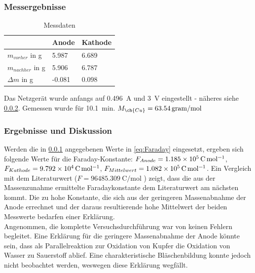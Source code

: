 \documentclass{article}
\begin{document}
      \subsubsection{Messergebnisse} \label{sec:MessergebnisseFaraday}
      
        \begin{table}[H]
          \centering
          \caption[Messdaten der Bestimmung der Faraday Konstante, Quelle: Autor]{Messdaten}
          \label{tab:MessdatenFaraday}
            \begin{tabular}{@{}l|ll@{}}
              \toprule
                & Anode & Kathode \\ \midrule
               $m_{vorher}$ in g & 5.987 & 6.689 \\
               $m_{nachher}$ in g & 5.906 & 6.787 \\
               $\Delta m$ in g & -0.081 & 0.098 \\ \bottomrule
            \end{tabular}
        \end{table}
        
        Das Netzgerät wurde anfangs auf \SI[mode=text]{0.496}{\ampere} und \SI[mode=text]{3}{\volt} eingestellt - näheres siehe \ref{sec:ErgebnisseFaraday}. Gemessen wurde für \SI[mode=text]{10.1}{\minute}. $M_{\ch{Cu}}=\SI[mode=text]{63.54}{gram\per\mole}$
        
      \subsubsection{Ergebnisse und Diskussion} \label{sec:ErgebnisseFaraday}
      
        Werden die in \ref{sec:MessergebnisseFaraday} angegebenen Werte in \eqref{eq:Faraday} eingesetzt, ergeben sich folgende Werte für die Faraday-Konstante: $F_{Anode} = \SI[mode=text]{1.185d5}{\coulomb\per\mole}$, $F_{Kathode} = \SI[mode=text]{9.792d4}{\coulomb\per\mole}$, $F_{Mittelwert} = \SI[mode=text]{1.082d5}{\coulomb\per\mole}$. Ein Vergleich mit dem Literaturwert ($F = \SI[mode=text]{96485.309}{\coulomb\per\mole}$ \cite{Faraday}) zeigt, dass die aus der Massenzunahme ermittelte Faradaykonstante dem Literaturwert am nächsten kommt. Die zu hohe Konstante, die sich aus der geringeren Massenabnahme der Anode errechnet und der daraus resultierende hohe Mittelwert der beiden Messwerte bedarfen einer Erklärung. \\
        
        Angenommen, die komplette Versuchsdurchführung war von keinen Fehlern begleitet. Eine Erklärung für die geringere Massenabnahme der Anode könnte sein, dass als Parallelreaktion zur Oxidation von Kupfer die Oxidation von Wasser zu Sauerstoff ablief. Eine charakteristische Bläschenbildung konnte jedoch nicht beobachtet werden, weswegen diese Erklärung wegfällt. 
        
\end{document}
